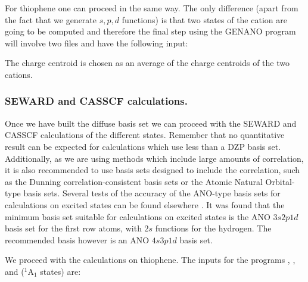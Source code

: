 For thiophene one can proceed in the same way. The only
difference (apart from the fact that we generate $s,p,d$
functions) is that two states of the cation are going to
be computed and therefore the final step using the
GENANO program will involve two files and have the following input:


The charge centroid is chosen as an average of the charge centroids
of the two cations.

\subsubsection{SEWARD and CASSCF calculations.}


Once we have built the diffuse basis set we can proceed with the
SEWARD and CASSCF calculations of the different states. Remember that
no quantitative result can be expected for calculations which use
less than a DZP basis set. Additionally, as we are using methods
which include large amounts of correlation, it is also recommended
to use basis sets designed to include the correlation, such as the
Dunning correlation-consistent basis sets or the Atomic Natural
Orbital-type basis sets. Several tests of the accuracy of the
ANO-type basis sets for calculations on excited states can
be found elsewhere \cite{Fuelscher:94a}. It was found that the
minimum basis set suitable for calculations on excited states
is the ANO $3s2p1d$ basis set for the first row atoms, with
$2s$ functions for the hydrogen. The recommended basis however is
an ANO $4s3p1d$ basis set.

We proceed with the calculations on thiophene. The inputs for
the programs , , and 
($^1$A$_1$ states) are:

